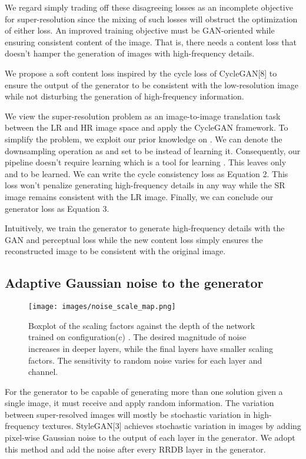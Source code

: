 \documentclass{article}
\begin{document}
We regard simply trading off these disagreeing losses as an incomplete objective for super-resolution since the mixing of such losses will obstruct the optimization of either loss. An improved training objective must be GAN-oriented while ensuring consistent content of the image. That is, there needs a content loss that doesn't hamper the generation of images with high-frequency details.

We propose a soft content loss inspired by the cycle loss of CycleGAN[8] to ensure the output of the generator to be consistent with the low-resolution image while not disturbing the generation of high-frequency information.


We view the super-resolution problem as an image-to-image translation task between the LR and HR image space and apply the CycleGAN framework. To simplify the problem, we exploit our prior knowledge on . We can denote the downsampling operation as  and set  to be  instead of learning it. Consequently, our pipeline doesn't require learning  which is a tool for learning . This leaves only  and  to be learned. We can write the cycle consistency loss as Equation 2. This loss won't penalize generating high-frequency details in any way while the SR image remains consistent with the LR image. Finally, we can conclude our generator loss as Equation 3.






Intuitively, we train the generator to generate high-frequency details with the GAN and perceptual loss while the new content loss simply ensures the reconstructed image to be consistent with the original image. 
\subsection{Adaptive Gaussian noise to the generator}

\begin{figure}
    \centering
    \texttt{[image: images/noise\_scale\_map.png]}
    \caption{Boxplot of the scaling factors against the depth of the network trained on  configuration(c) . The desired magnitude of noise increases in deeper layers, while the final layers have smaller scaling factors. The sensitivity to random noise varies for each layer and channel.}
\end{figure}

For the generator to be capable of generating more than one solution given a single image, it must receive and apply random information. The variation between super-resolved images will mostly be stochastic variation in high-frequency textures. StyleGAN[3] achieves stochastic variation in images by adding pixel-wise Gaussian noise to the output of each layer in the generator. We adopt this method and add the noise after every RRDB layer in the generator. 
\end{document}
